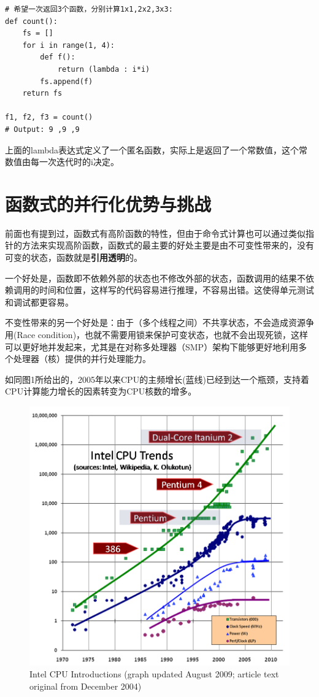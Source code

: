 \documentclass{article}
\begin{document}
\lstset{language=python}
\begin{lstlisting}
# 希望一次返回3个函数，分别计算1x1,2x2,3x3:
def count():
	fs = []
	for i in range(1, 4):
		def f():	
			return (lambda : i*i)		
		fs.append(f)
	return fs

f1, f2, f3 = count()
# Output: 9 ,9 ,9
\end{lstlisting}
		上面的lambda表达式定义了一个匿名函数，实际上是返回了一个常数值，这个常数值由每一次迭代时的i决定。
	
	\section{函数式的并行化优势与挑战}
		前面也有提到过，函数式有高阶函数的特性，但由于命令式计算也可以通过类似指针的方法来实现高阶函数，函数式的最主要的好处主要是由不可变性带来的，没有可变的状态，函数就是\textbf{引用透明}的。
		
		一个好处是，函数即不依赖外部的状态也不修改外部的状态，函数调用的结果不依赖调用的时间和位置，这样写的代码容易进行推理，不容易出错。这使得单元测试和调试都更容易。
		
		不变性带来的另一个好处是：由于（多个线程之间）不共享状态，不会造成资源争用(Race condition)，也就不需要用锁来保护可变状态，也就不会出现死锁，这样可以更好地并发起来，尤其是在对称多处理器（SMP）架构下能够更好地利用多个处理器（核）提供的并行处理能力。
		
		如同图1所给出的，2005年以来CPU的主频增长(蓝线)已经到达一个瓶颈，支持着CPU计算能力增长的因素转变为CPU核数的增多。
		
		\begin{figure}[ht]
			\centering
			\includegraphics[scale=0.6]{CPU.png}
			\caption{Intel CPU Introductions (graph updated August 2009; article text original from December 2004)}
			\label{fig:label}
		\end{figure}
	
\end{document}
